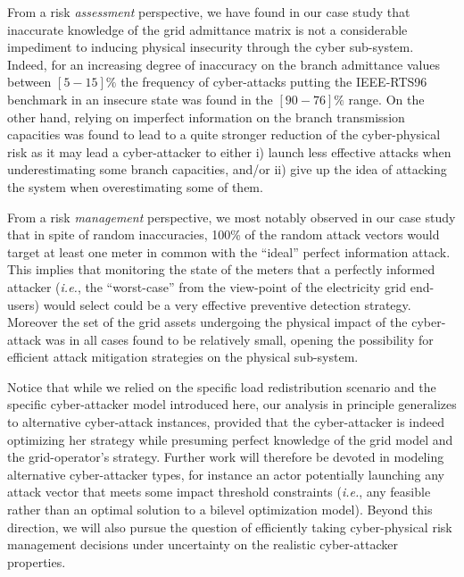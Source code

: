 \documentclass{IEEEtran4PSCC}
\begin{document}
From a risk  {\emph{assessment}} perspective, we have found  {in our case study} that inaccurate knowledge of the grid admittance matrix is not a considerable impediment to inducing physical insecurity through the cyber sub-system. Indeed, for an increasing degree of inaccuracy on the branch admittance values between $[5 - 15]\%$ the frequency of cyber-attacks putting the IEEE-RTS96 benchmark in an insecure state was found in the $[90 - 76]\%$ range.  {On the other hand,} relying on imperfect information on the branch transmission capacities  {was found}   {to lead to a quite stronger reduction of the} cyber-physical risk as it may lead a cyber-attacker to either i) launch less effective attacks  {when underestimating some} branch capacities, and/or ii)  {give up the idea of} attacking the system  {when overestimating some of them}.

From a risk   {\emph{management}} perspective, we most notably  {observed in our case study} that in spite of random inaccuracies, 100\% of the random attack vectors would target at least one meter in common with the  {``ideal''} perfect information attack. This implies that monitoring the state of the meters that a perfectly informed attacker (\textit{i.e.}, the  {``worst-case'' from the view-point of the electricity grid end-users}) would select could be a very effective preventive detection strategy. Moreover the set of the grid assets undergoing the physical impact of the cyber-attack was in all cases found to be relatively small, opening the possibility for efficient attack mitigation strategies on the physical sub-system.


Notice that while we relied on the specific load redistribution scenario and the specific cyber-attacker model introduced here, our analysis in principle generalizes to alternative cyber-attack instances, provided that the cyber-attacker is indeed optimizing her strategy while presuming perfect knowledge of the grid model and the grid-operator's strategy. Further work will therefore be devoted in modeling alternative cyber-attacker types, for instance an actor potentially launching any attack vector that meets some impact threshold constraints (\textit{i.e.}, any feasible rather than an optimal solution to a bilevel optimization model). Beyond this direction, we will also pursue the question of efficiently taking cyber-physical risk management decisions under uncertainty on the realistic cyber-attacker properties. 









\end{document}
